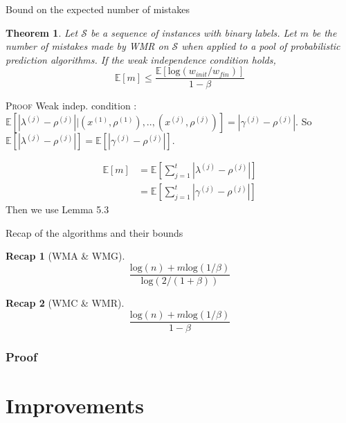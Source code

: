 \documentclass{beamer}
\newtheorem{Th}{Theorem}
\newtheorem{recap}{Recap}
\newcommand{\esp}[1]{\mathbb{E}\!\left[#1\right]}
\newcommand{\abs}[1]{\left\lvert#1\right\rvert}
\begin{document}
\begin{frame}{Bound on the expected number of mistakes}

\begin{Th}
Let $\mathcal{S}$ be a sequence of instances with binary labels. Let $m$ be the number of mistakes made by WMR on $\mathcal{S}$ when applied to a pool of probabilistic prediction algorithms. If the weak independence condition holds,
\[\esp{m}\leq\frac{\esp{\mathrm{log}(w_{init}/w_{fin})}}{1 - \beta}\]
\end{Th}
\textsc{Proof}\newline
Weak indep. condition : $\esp{\abs{\lambda^{(j)} - \rho^{(j)}}|(x^{(1)}, \rho^{(1)}), .., (x^{(j)}, \rho^{(j)})} = \abs{\gamma^{(j)} - \rho^{(j)}}$.\newline
So $\esp{\abs{\lambda^{(j)} - \rho^{(j)}}} = \esp{\abs{\gamma^{(j)} - \rho^{(j)}}}$.

\end{frame}

\begin{frame}

\begin{align*}
\esp{m} &= \esp{\sum_{j=1}^{t}\abs{\lambda^{(j)} - \rho^{(j)}}} \\
				&= \esp{\sum_{j=1}^{t}\abs{\gamma^{(j)} - \rho^{(j)}}}
\end{align*}
Then we use Lemma 5.3

\end{frame}

\begin{frame}{Recap of the algorithms and their bounds}

\begin{recap}[WMA \& WMG]
\[\frac{\mathrm{log}(n) + m\mathrm{log}(1/\beta)}{\mathrm{log}(2/(1+\beta))}\]
\end{recap}


\begin{recap}[WMC \& WMR]
\[\frac{\mathrm{log}(n) + m\mathrm{log}(1/\beta)}{1 - \beta}\]
\end{recap}


\end{frame}


			\subsubsection*{Proof}
			
	\section{Improvements}
\end{document}
